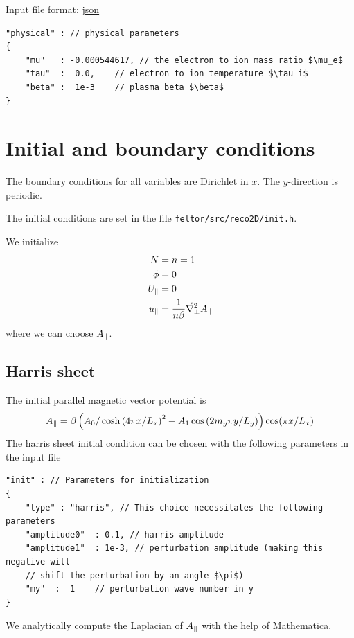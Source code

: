 Input file format: \href{https://en.wikipedia.org/wiki/JSON}{json} \\
\begin{verbatim}
"physical" : // physical parameters
{
    "mu"   : -0.000544617, // the electron to ion mass ratio $\mu_e$
    "tau"  :  0.0,    // electron to ion temperature $\tau_i$
    "beta" :  1e-3    // plasma beta $\beta$
}
\end{verbatim}

\section{Initial and boundary conditions}
The boundary conditions for all variables are Dirichlet in $x$.
The $y$-direction is periodic.

The initial conditions are set in the file \texttt{feltor/src/reco2D/init.h}.

We initialize
\begin{align}
 N&=n =1 \\
 \phi &= 0 \\
  U_\parallel&=0 \\
  u_\parallel &= \frac{1}{n  \beta }\vec{\nabla}^2_{\perp} A_\parallel
\end{align}
where we can choose $A_\parallel$.
\subsection{Harris sheet}
The initial parallel magnetic vector potential is
\begin{align}
    A_\parallel =\beta\left( A_0 / \cosh{( 4  \pi x / L_x )}^2 +A_1\cos{(2 m_y\pi y/L_y)}\right) \cos( \pi x /L_x)
\end{align}
The harris sheet initial condition can be chosen with the following parameters in the input file
\begin{verbatim}
"init" : // Parameters for initialization
{
    "type" : "harris", // This choice necessitates the following parameters
    "amplitude0"  : 0.1, // harris amplitude
    "amplitude1"  : 1e-3, // perturbation amplitude (making this negative will
    // shift the perturbation by an angle $\pi$)
    "my"  :  1    // perturbation wave number in y
}
\end{verbatim}
We analytically compute the Laplacian of $A_\parallel$ with the help of Mathematica.
